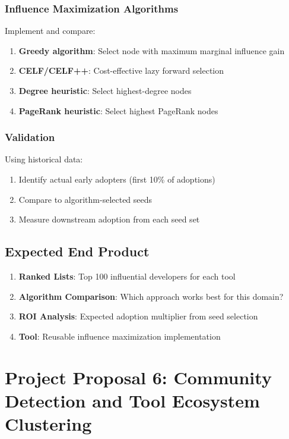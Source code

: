 \documentclass[11pt,letterpaper]{article}
\begin{document}
\subsubsection{Influence Maximization Algorithms}

Implement and compare:
\begin{enumerate}
    \item \textbf{Greedy algorithm}: Select node with maximum marginal influence gain
    \item \textbf{CELF/CELF++}: Cost-effective lazy forward selection
    \item \textbf{Degree heuristic}: Select highest-degree nodes
    \item \textbf{PageRank heuristic}: Select highest PageRank nodes
\end{enumerate}

\subsubsection{Validation}

Using historical data:
\begin{enumerate}
    \item Identify actual early adopters (first 10\% of adoptions)
    \item Compare to algorithm-selected seeds
    \item Measure downstream adoption from each seed set
\end{enumerate}

\subsection{Expected End Product}

\begin{enumerate}
    \item \textbf{Ranked Lists}: Top 100 influential developers for each tool
    \item \textbf{Algorithm Comparison}: Which approach works best for this domain?
    \item \textbf{ROI Analysis}: Expected adoption multiplier from seed selection
    \item \textbf{Tool}: Reusable influence maximization implementation
\end{enumerate}

\section{Project Proposal 6: Community Detection and Tool Ecosystem Clustering}
\end{document}
